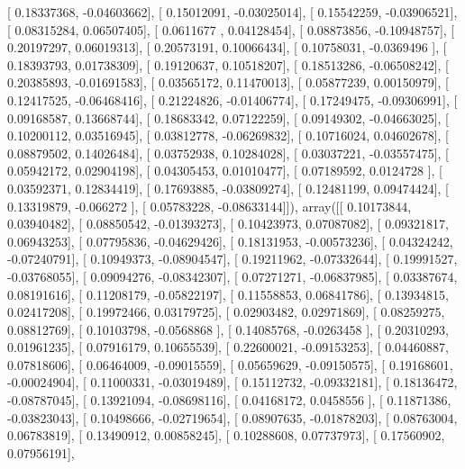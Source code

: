 \documentclass{article}
\begin{document}
       [ 0.18337368, -0.04603662],
       [ 0.15012091, -0.03025014],
       [ 0.15542259, -0.03906521],
       [ 0.08315284,  0.06507405],
       [ 0.0611677 ,  0.04128454],
       [ 0.08873856, -0.10948757],
       [ 0.20197297,  0.06019313],
       [ 0.20573191,  0.10066434],
       [ 0.10758031, -0.0369496 ],
       [ 0.18393793,  0.01738309],
       [ 0.19120637,  0.10518207],
       [ 0.18513286, -0.06508242],
       [ 0.20385893, -0.01691583],
       [ 0.03565172,  0.11470013],
       [ 0.05877239,  0.00150979],
       [ 0.12417525, -0.06468416],
       [ 0.21224826, -0.01406774],
       [ 0.17249475, -0.09306991],
       [ 0.09168587,  0.13668744],
       [ 0.18683342,  0.07122259],
       [ 0.09149302, -0.04663025],
       [ 0.10200112,  0.03516945],
       [ 0.03812778, -0.06269832],
       [ 0.10716024,  0.04602678],
       [ 0.08879502,  0.14026484],
       [ 0.03752938,  0.10284028],
       [ 0.03037221, -0.03557475],
       [ 0.05942172,  0.02904198],
       [ 0.04305453,  0.01010477],
       [ 0.07189592,  0.0124728 ],
       [ 0.03592371,  0.12834419],
       [ 0.17693885, -0.03809274],
       [ 0.12481199,  0.09474424],
       [ 0.13319879, -0.066272  ],
       [ 0.05783228, -0.08633144]]), array([[ 0.10173844,  0.03940482],
       [ 0.08850542, -0.01393273],
       [ 0.10423973,  0.07087082],
       [ 0.09321817,  0.06943253],
       [ 0.07795836, -0.04629426],
       [ 0.18131953, -0.00573236],
       [ 0.04324242, -0.07240791],
       [ 0.10949373, -0.08904547],
       [ 0.19211962, -0.07332644],
       [ 0.19991527, -0.03768055],
       [ 0.09094276, -0.08342307],
       [ 0.07271271, -0.06837985],
       [ 0.03387674,  0.08191616],
       [ 0.11208179, -0.05822197],
       [ 0.11558853,  0.06841786],
       [ 0.13934815,  0.02417208],
       [ 0.19972466,  0.03179725],
       [ 0.02903482,  0.02971869],
       [ 0.08259275,  0.08812769],
       [ 0.10103798, -0.0568868 ],
       [ 0.14085768, -0.0263458 ],
       [ 0.20310293,  0.01961235],
       [ 0.07916179,  0.10655539],
       [ 0.22600021, -0.09153253],
       [ 0.04460887,  0.07818606],
       [ 0.06464009, -0.09015559],
       [ 0.05659629, -0.09150575],
       [ 0.19168601, -0.00024904],
       [ 0.11000331, -0.03019489],
       [ 0.15112732, -0.09332181],
       [ 0.18136472, -0.08787045],
       [ 0.13921094, -0.08698116],
       [ 0.04168172,  0.0458556 ],
       [ 0.11871386, -0.03823043],
       [ 0.10498666, -0.02719654],
       [ 0.08907635, -0.01878203],
       [ 0.08763004,  0.06783819],
       [ 0.13490912,  0.00858245],
       [ 0.10288608,  0.07737973],
       [ 0.17560902,  0.07956191],
\end{document}
